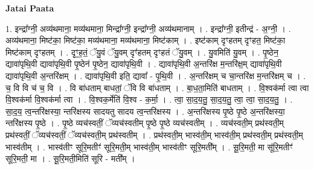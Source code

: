 \documentclass[17pt]{extarticle}
\begin{document}
\textbf{Jatai Paata} \newline

1. इन्द्रा᳚ग्नी॒ अव्य॑थमाना॒ मव्य॑थमाना॒ मिन्द्रा᳚ग्नी॒ इन्द्रा᳚ग्नी॒ अव्य॑थमानाम् । . इन्द्रा᳚ग्नी॒ इतीन्द्र॑ - अ॒ग्नी॒ । . अव्य॑थमाना॒ मिष्ट॑का॒ मिष्ट॑का॒ मव्य॑थमाना॒ मव्य॑थमाना॒ मिष्ट॑काम् । . इष्ट॑काम् दृꣳहतम् दृꣳहत॒ मिष्ट॑का॒ मिष्ट॑काम् दृꣳहतम् । . दृꣳ॒॒ह॒तं॒ ॅयु॒वं ॅयु॒वम् दृꣳ॑हतम् दृꣳहतं ॅयु॒वम् । . यु॒वमिति॑ यु॒वम् । . पृ॒ष्ठेन॒ द्यावा॑पृथि॒वी द्यावा॑पृथि॒वी पृ॒ष्ठेन॑ पृ॒ष्ठेन॒ द्यावा॑पृथि॒वी । . द्यावा॑पृथि॒वी अ॒न्तरि॑क्ष म॒न्तरि॑क्ष॒म् द्यावा॑पृथि॒वी द्यावा॑पृथि॒वी अ॒न्तरि॑क्षम् । . द्यावा॑पृथि॒वी इति॒ द्यावा᳚ - पृ॒थि॒वी । . अ॒न्तरि॑क्षम् च चा॒न्तरि॑क्ष म॒न्तरि॑क्षम् च । . च॒ वि वि च॑ च॒ वि । . वि बा॑धताम् बाधतां॒ ॅवि वि बा॑धताम् । . बा॒ध॒ता॒मिति॑ बाधताम् । . वि॒श्वक॑र्मा त्वा त्वा वि॒श्वक॑र्मा वि॒श्वक॑र्मा त्वा । . वि॒श्वक॒र्मेति॑ वि॒श्व - क॒र्मा॒ । . त्वा॒ सा॒द॒य॒तु॒ सा॒द॒य॒तु॒ त्वा॒ त्वा॒ सा॒द॒य॒तु॒ । . सा॒द॒य॒ त्व॒न्तरि॑क्षस्या॒ न्तरि॑क्षस्य सादयतु सादय त्व॒न्तरि॑क्षस्य । . अ॒न्तरि॑क्षस्य पृ॒ष्ठे पृ॒ष्ठे अ॒न्तरि॑क्षस्या॒ न्तरि॑क्षस्य पृ॒ष्ठे । . पृ॒ष्ठे व्यच॑स्वतीं॒ ॅव्यच॑स्वतीम् पृ॒ष्ठे पृ॒ष्ठे व्यच॑स्वतीम् । . व्यच॑स्वती॒म् प्रथ॑स्वती॒म् प्रथ॑स्वतीं॒ ॅव्यच॑स्वतीं॒ ॅव्यच॑स्वती॒म् प्रथ॑स्वतीम् । . प्रथ॑स्वती॒म् भास्व॑ती॒म् भास्व॑ती॒म् प्रथ॑स्वती॒म् प्रथ॑स्वती॒म् भास्व॑तीम् । . भास्व॑तीꣳ सूरि॒मतीꣳ॑ सूरि॒मती॒म् भास्व॑ती॒म् भास्व॑तीꣳ सूरि॒मती᳚म् । . सू॒रि॒मती॒ मा सू॑रि॒मतीꣳ॑ सूरि॒मती॒ मा । . सू॒रि॒मती॒मिति॑ सूरि - मती᳚म् । \newline
\end{document}
